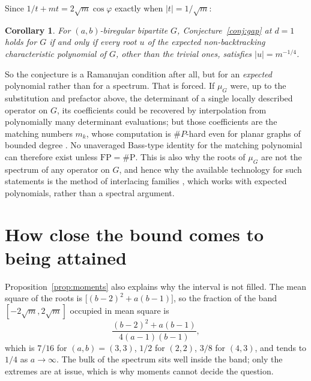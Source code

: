 \documentclass[11pt]{article}
\newtheorem{corollary}[theorem]{Corollary}
\theoremstyle{remark}
\begin{document}
Since $1/t+mt=2\sqrt m\cos\varphi$ exactly when $|t|=1/\sqrt m$:

\begin{corollary}\label{cor:ramanujan}
For $(a,b)$-biregular bipartite $G$, Conjecture~\ref{conj:gap} at $d=1$ holds for
$G$ if and only if every root $u$ of the expected non-backtracking characteristic
polynomial of $G$, other than the trivial ones, satisfies $|u|=m^{-1/4}$.
\end{corollary}

So the conjecture is a Ramanujan condition after all, but for an \emph{expected}
polynomial rather than for a spectrum. That is forced. If $\mu_G$ were, up to the
substitution and prefactor above, the determinant of a single locally described
operator on $G$, its coefficients could be recovered by interpolation from
polynomially many determinant evaluations; but those coefficients are the
matching numbers $m_k$, whose computation is $\#P$-hard even for planar graphs of
bounded degree \cite{Je}. No unaveraged Bass-type identity for the matching
polynomial can therefore exist unless $\mathrm{FP}=\#\mathrm P$. This is also why
the roots of $\mu_G$ are not the spectrum of any operator on $G$, and hence why
the available technology for such statements is the method of interlacing
families \cite{MSS}, which works with expected polynomials, rather than a
spectral argument.

\section{How close the bound comes to being attained}

Proposition~\ref{prop:moments} also explains why the interval is not filled. The
mean square of the roots is $\bigl[(b-2)^2+a(b-1)\bigr]$, so the fraction of the
band $[-2\sqrt m,2\sqrt m]$ occupied in mean square is
\[
\frac{(b-2)^2+a(b-1)}{4(a-1)(b-1)},
\]
which is $7/16$ for $(a,b)=(3,3)$, $1/2$ for $(2,2)$, $3/8$ for $(4,3)$, and
tends to $1/4$ as $a\to\infty$. The bulk of the spectrum sits well inside the
band; only the extremes are at issue, which is why moments cannot decide the
question.
\end{document}

